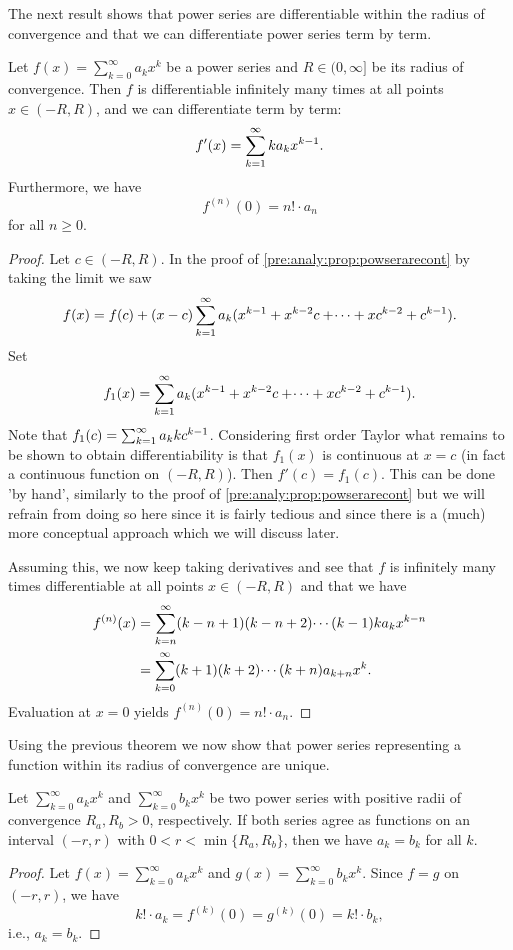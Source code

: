 \documentclass[10pt, a4paper]{article}
\newcommand{\infsumo}[1][k = 0]{\sum_{#1}^{\infty}}
\begin{document}
The next result shows that power series are differentiable within the radius of convergence and that we can differentiate power series term by term.

\begin{theorem}\label{pre:analy:thm:funcofpowseriesinfdiff}
    Let $f(x) = \infsumo a_kx ^ k$ be a power series and $R \in (0, \infty]$ be its radius of convergence.
    Then $f$ is differentiable infinitely many times at all points $x \in (-R, R)$,
    and we can differentiate term by term:
    \[
    f'(x) = \sum_{k = 1}^{\infty} ka_kx ^ {k - 1}.
    \]
    Furthermore,
    we have
    \[
    f ^ {(n)}(0) = n! \cdot a_n
    \]
    for all $n \geq 0$.
    \begin{proof}
        Let $c \in (-R, R)$.
        In the proof of \autoref{pre:analy:prop:powserarecont} by taking the limit we saw
        \[
        f(x) = f(c) + (x - c)\sum_{k = 1}^{\infty} a_k(x ^ {k - 1} + x ^ {k - 2}c + \dotsi + xc ^ {k - 2} + c ^ {k - 1}).
        \]
        Set
        \[
        f_1(x) = \sum_{k = 1}^{\infty} a_k(x ^ {k - 1} + x ^ {k - 2}c + \dotsi + xc ^ {k - 2} + c ^ {k - 1}).
        \]
         Note that $f_1(c) = \sum_{k = 1}^{\infty} a_kkc ^ {k - 1}$.
         Considering first order Taylor what remains to be shown to obtain differentiability is that $f_1(x)$ is continuous at $x = c$
         (in fact a continuous function on $(-R, R)$).
         Then $f'(c) = f_1(c)$.
         This can be done 'by hand',
         similarly to the proof of \autoref{pre:analy:prop:powserarecont} but we will refrain from doing so here since it is fairly tedious and since there is a
         (much)
         more conceptual approach which we will discuss later.

         Assuming this,
         we now keep taking derivatives and see that $f$ is infinitely many times differentiable at all points $x \in (-R, R)$ and that we have
         \begin{align*}
             f ^ {(n)}(x) &= \infsum[k = n](k - n + 1)(k - n + 2)\dotsi(k - 1)ka_kx ^ {k - n} \\
             &= \infsumo(k + 1)(k + 2)\dotsi(k + n)a_{k + n}x ^ k.
         \end{align*}
         Evaluation at $x = 0$ yields $f ^ {(n)}(0) = n! \cdot a_n$.
    \end{proof}
\end{theorem}

Using the previous theorem we now show that power series representing a function within its radius of convergence are unique.
\begin{theorem}
    Let $\infsumo a_kx ^ k$ and $\infsumo b_kx ^ k$ be two power series with positive radii of convergence $R_a, R_b > 0$,
    respectively.
    If both series agree as functions on an interval $(-r, r)$ with $0 < r < \min\{R_a, R_b\}$,
    then we have $a_k = b_k$ for all $k$.
    \begin{proof}
        Let $f(x) = \infsumo a_kx ^ k$ and $g(x) = \infsumo b_kx ^ k$.
        Since $f = g$ on $(-r, r)$,
        we have
        \[
        k! \cdot a_k = f ^ {(k)}(0) = g ^ {(k)}(0) = k! \cdot b_k,
        \]
        i.e.,
        $a_k = b_k$.
    \end{proof}
\end{theorem}
\end{document}
